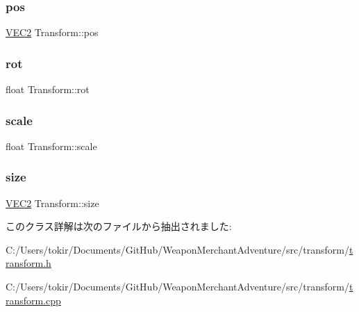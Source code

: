 \subsubsection{\texorpdfstring{pos}{pos}}
{\footnotesize\ttfamily \mbox{\hyperlink{transform_8h_afb0c5e21d4133ff4f200992c0b534e1b}{V\+E\+C2}} Transform\+::pos}

\mbox{\label{class_transform_a2b471ae0000c6959dc9b07263933aa43}} 
\subsubsection{\texorpdfstring{rot}{rot}}
{\footnotesize\ttfamily float Transform\+::rot}

\mbox{\label{class_transform_a631712eb230305f58d164086d492701b}} 
\subsubsection{\texorpdfstring{scale}{scale}}
{\footnotesize\ttfamily float Transform\+::scale}

\mbox{\label{class_transform_a83e0bdbf8a2b4a45197d17d7415a6874}} 
\subsubsection{\texorpdfstring{size}{size}}
{\footnotesize\ttfamily \mbox{\hyperlink{transform_8h_afb0c5e21d4133ff4f200992c0b534e1b}{V\+E\+C2}} Transform\+::size}



このクラス詳解は次のファイルから抽出されました\+:\begin{DoxyCompactItemize}
\item 
C\+:/\+Users/tokir/\+Documents/\+Git\+Hub/\+Weapon\+Merchant\+Adventure/src/transform/\mbox{\hyperlink{transform_8h}{transform.\+h}}\item 
C\+:/\+Users/tokir/\+Documents/\+Git\+Hub/\+Weapon\+Merchant\+Adventure/src/transform/\mbox{\hyperlink{transform_8cpp}{transform.\+cpp}}\end{DoxyCompactItemize}

